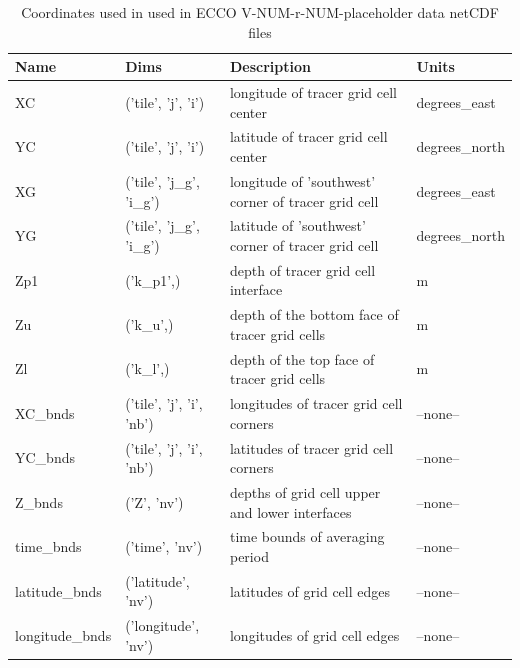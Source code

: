 \begin{longtable}{|p{}|p{}|p{}|p{}|}
\caption{Coordinates used in used in ECCO V-NUM-r-NUM-placeholder data netCDF files}
\label{tab:coordinate-attributes} \\ 
\hline \endfirsthead
\endhead
\endfoot
\hline \endlastfoot
\rowcolor{blue!25} \textbf{Name} & \textbf{Dims} & \textbf{Description} & \textbf{Units} \\ \hline
\rowcolor{magenta!25}
XC & ('tile', 'j', 'i') & longitude of tracer grid cell center & degrees\_east \\ \hline
\rowcolor{magenta!25}
YC & ('tile', 'j', 'i') & latitude of tracer grid cell center & degrees\_north \\ \hline
\rowcolor{magenta!25}
XG & ('tile', 'j\_g', 'i\_g') & longitude of 'southwest' corner of tracer grid cell & degrees\_east \\ \hline
\rowcolor{magenta!25}
YG & ('tile', 'j\_g', 'i\_g') & latitude of 'southwest' corner of tracer grid cell & degrees\_north \\ \hline
\rowcolor{magenta!25}
Zp1 & ('k\_p1',) & depth of tracer grid cell interface & m \\ \hline
\rowcolor{magenta!25}
Zu & ('k\_u',) & depth of the bottom face of tracer grid cells & m \\ \hline
\rowcolor{magenta!25}
Zl & ('k\_l',) & depth of the top face of tracer grid cells & m \\ \hline
\rowcolor{magenta!25}
XC\_bnds & ('tile', 'j', 'i', 'nb') & longitudes of tracer grid cell corners & --none-- \\ \hline
\rowcolor{magenta!25}
YC\_bnds & ('tile', 'j', 'i', 'nb') & latitudes of tracer grid cell corners & --none-- \\ \hline
\rowcolor{magenta!25}
Z\_bnds & ('Z', 'nv') & depths of grid cell upper and lower interfaces & --none-- \\ \hline
\rowcolor{magenta!25}
time\_bnds & ('time', 'nv') & time bounds of averaging period & --none-- \\ \hline
\rowcolor{magenta!25}
latitude\_bnds & ('latitude', 'nv') & latitudes of grid cell edges & --none-- \\ \hline
\rowcolor{magenta!25}
longitude\_bnds & ('longitude', 'nv') & longitudes of grid cell edges & --none-- \\ \hline
\end{longtable}
